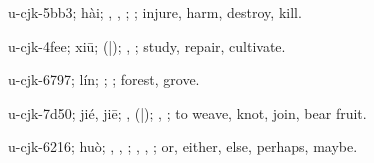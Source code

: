 \begin{multicols}{2}
{\cjkgGlue{}u-cjk-5bb3; hài; \cjkgGlue{}, \cjkgGlue{}, \cjkgGlue{}; \cjkgGlue{}; injure, harm, destroy, kill.

\cjkgGlue{}u-cjk-4fee; xiū; \cjkgGlue{}\cjkgGlue{}(\cjkgGlue{}|\cjkgGlue{}); \cjkgGlue{}, \cjkgGlue{}; study, repair, cultivate.

\cjkgGlue{}u-cjk-6797; lín; \cjkgGlue{}; \cjkgGlue{}; forest, grove.

\cjkgGlue{}u-cjk-7d50; jié, jiē; \cjkgGlue{}\cjkgGlue{}\cjkgGlue{}, \cjkgGlue{}\cjkgGlue{}(\cjkgGlue{}|\cjkgGlue{}); \cjkgGlue{}, \cjkgGlue{}; to weave, knot, join, bear fruit.

\cjkgGlue{}u-cjk-6216; huò; \cjkgGlue{}\cjkgGlue{}\cjkgGlue{}, \cjkgGlue{}, \cjkgGlue{}; \cjkgGlue{}, \cjkgGlue{}, \cjkgGlue{}; or, either, else, perhaps, maybe.

}
\end{multicols}
